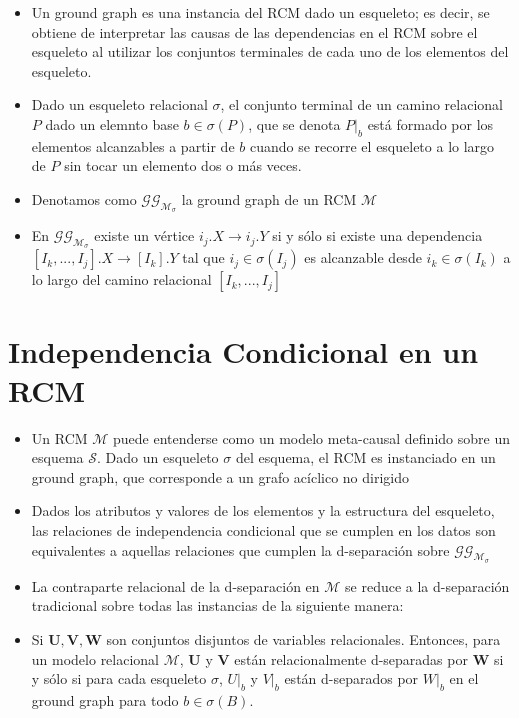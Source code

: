 \documentclass[11pt]{article}
\theoremstyle{plain}
\begin{document}
\begin{itemize}
\item Un ground graph es una instancia del RCM dado un esqueleto; es decir, se obtiene de interpretar las causas de las dependencias en el RCM sobre el esqueleto al utilizar los conjuntos terminales de cada uno de los elementos del esqueleto. 
\item Dado un esqueleto relacional $\sigma$, el conjunto terminal de un camino relacional $P$ dado un elemnto base $b \in \sigma(P)$, que se denota $P | _b$ está formado por los elementos alcanzables a partir de $b$ cuando se recorre el esqueleto a lo largo de $P$ sin tocar un elemento dos o más veces.
\item Denotamos como $\mathcal{GG}_{\mathcal{M}_\sigma}$ la ground graph de un RCM $\mathcal{M}$
\item En $\mathcal{GG}_{\mathcal{M}_\sigma}$ existe un vértice $i_j . X \to i_j . Y$ si y sólo si existe una dependencia $[I_k,...,I_j].X \to [I_k].Y$ tal que $i_j \in \sigma(I_j)$ es alcanzable desde $i_k \in \sigma(I_k)$ a lo largo del camino relacional $[I_k,...,I_j]$
\end{itemize}
\section{Independencia Condicional en un RCM}
\begin{itemize}
\item Un RCM $\mathcal{M}$ puede entenderse como un modelo meta-causal definido sobre un esquema $\mathcal{S}$. Dado un esqueleto $\sigma$ del esquema, el RCM es instanciado en un ground graph, que corresponde a un grafo acíclico no dirigido
\item Dados los atributos y valores de los elementos y la estructura del esqueleto, las relaciones de independencia condicional que se cumplen en los datos son equivalentes a aquellas relaciones que cumplen la d-separación sobre $\mathcal{GG}_{\mathcal{M}_\sigma}$
\item La contraparte relacional de la d-separación en $\mathcal{M}$ se reduce a la d-separación tradicional sobre todas las instancias de la siguiente manera:
\item Si $\mathbf{U},\mathbf{V},\mathbf{W}$ son conjuntos disjuntos de variables relacionales. Entonces, para un modelo relacional $\mathcal{M}$, $\mathbf{U}$ y $\mathbf{V}$ están relacionalmente d-separadas por $\mathbf{W}$ si y sólo si para cada esqueleto $\sigma$, $U | _b$ y $V | _b$ están d-separados por $W | _b$ en el ground graph para todo $b \in \sigma(B)$.
\end{itemize}
\end{document}

